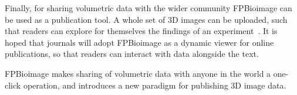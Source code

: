 Finally, for sharing volumetric data with the wider community FPBioimage can be used as a publication tool. 
A whole set of 3D images can be uploaded, such that readers can explore for themselves the findings of an experiment~\cite{teplensky2017temperature}.
It is hoped that journals will adopt FPBioimage as a dynamic viewer for online publications, so that readers can interact with data alongside the text. 

FPBioimage makes sharing of volumetric data with anyone in the world a one-click operation, and introduces a new paradigm for publishing 3D image data. 